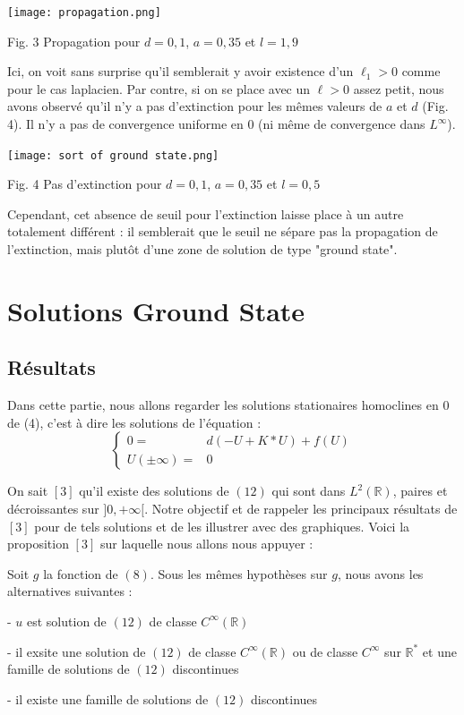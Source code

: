 \documentclass{article}
\begin{document}
\begin{center}
\texttt{[image: propagation.png]}

Fig. 3 Propagation pour $d = 0,1$, $a = 0,35$ et $l=1,9$
\end{center}

Ici, on voit sans surprise qu'il semblerait y avoir existence d'un $\ell_1>0$ comme pour le cas laplacien. Par contre, si on se place avec un $\ell>0$ assez petit, nous avons observé qu'il n'y a pas d'extinction pour les mêmes valeurs de $a$ et $d$ (Fig. 4). Il n'y a pas de convergence uniforme en 0 (ni même de convergence dans $L^{\infty}$). 

\begin{center}
\texttt{[image: sort	of ground state.png]}

Fig. 4 Pas d'extinction pour $d = 0,1$, $a = 0,35$ et $l=0,5$
\end{center}

Cependant, cet absence de seuil pour l'extinction laisse place à un autre totalement différent : il semblerait que le seuil ne sépare pas la propagation de l'extinction, mais plutôt d'une zone de solution de type "ground state".


\section{Solutions Ground State}

\subsection{Résultats}

Dans cette partie, nous allons regarder les solutions stationaires homoclines en 0 de (4), c'est à dire les solutions de l'équation : 
\begin{equation}
\left \{
\begin{array}{cc}
0  = & d(-U+K*U)+f(U) \\
U(\pm \infty) = & 0
\end{array}
\right.
\end{equation}

On sait $[3]$ qu'il existe des solutions de $(12)$ qui sont dans $L^2(\mathbb{R})$, paires et décroissantes sur $]0,+\infty[$. Notre objectif et de rappeler les principaux résultats de $[3]$ pour de tels solutions et de les illustrer avec des graphiques. Voici la proposition $[3]$ sur laquelle nous allons nous appuyer : 

\begin{Theoreme}[Chmaj 2006]
	Soit $g$ la fonction de $(8)$. Sous les mêmes hypothèses sur $g$, nous avons les alternatives suivantes : 

- $u$ est solution de $(12)$ de classe $C^{\infty}(\mathbb{R})$

- il exsite une solution de $(12)$ de classe $C^{\infty}(\mathbb{R})$ ou de classe $C^{\infty}$ sur $\mathbb{R}^*$ et une famille de solutions de $(12)$ discontinues

- il existe une famille de solutions de $(12)$ discontinues
\end{Theoreme}
\end{document}
